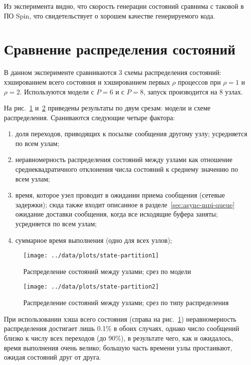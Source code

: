 Из эксперимента видно, что скорость генерации состояний сравнима с таковой в ПО Spin, что
свидетельствует о хорошем качестве генерируемого кода.

\section{Сравнение распределения состояний}
\label{sec:experiment-partition-cmp}

В данном эксперименте сравниваются 3 схемы распределения состояний: хэшированием всего
состояния и хэшированием первых $\rho$ процессов при $\rho = 1$ и $\rho = 2$. Используются
модели  с $P = 6$ и  с $P = 8$, запуск производится на 8 узлах.

На рис.~\ref{fig:state-partition1} и~\ref{fig:state-partition2} приведены результаты по
двум срезам: модели и схеме распределения. Сраниваются следующие четыре фактора:
\begin{enumerate}
\item доля переходов, приводящих к посылке сообщения другому узлу; усредняется по всем
  узлам;
\item неравномерность распределения состояний между узлами как отношение
  среднеквадратичного отклонения числа состояний к среднему значению по всем узлам;
\item время, которое узел проводит в ожидании приема сообщения (сетевые задержки); сюда
  также входит описанное в разделе~\ref{sec:async-mpi-queue} ожидание доставки сообщения,
  когда все исходящие буфера заняты; усредняется по всем узлам;
\item суммарное время выполнения (одно для всех узлов);
\end{enumerate}

\begin{figure}[p]
  \centering
  \texttt{[image: ../data/plots/state-partition1]}
  \caption{Распределение состояний между узлами; срез по модели}
  \label{fig:state-partition1}
\end{figure}

\begin{figure}[p]
  \centering
  \texttt{[image: ../data/plots/state-partition2]}
  \caption{Распределение состояний между узлами; срез по типу распределения}
  \label{fig:state-partition2}
\end{figure}

При использовании хэша всего состояния (справа на рис.~\ref{fig:state-partition1})
неравномерность распределения достигает лишь 0.1\% в обоих случаях, однако число сообщений
близко к числу всех переходов (до 90\%), в результате чего, как и ожидалось, время
выполнения очень велико; большую часть времени узлы простаивают, ожидая состояний друг от
друга. 

